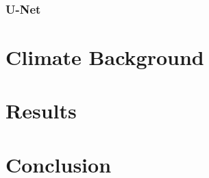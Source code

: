 \documentclass[ oneside,%
                    author={George Herbert},
                    degree={MSci},
                     title={Video Diffusion Models for Climate Simulations},
                  subtitle={}]{dissertation}
\begin{document}
\subsection{U-Net}
\label{sec:background_unet}



\chapter{Climate Background}
\label{chap:background_climate}


\chapter{Results}
\label{chap:results}


\chapter{Conclusion}
\label{chap:conclusion}


%
%
%

\backmatter
\end{document}
